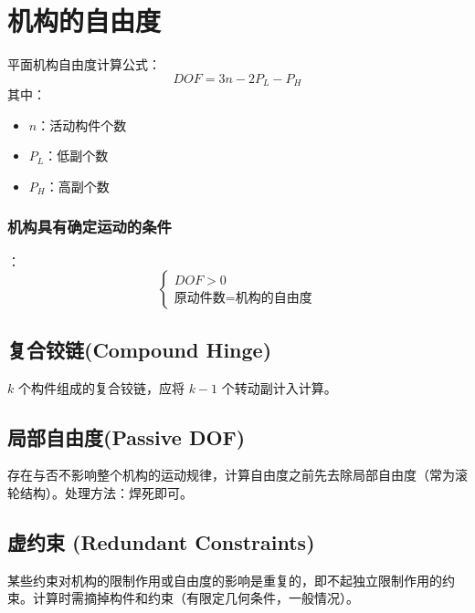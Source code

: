 \section{机构的自由度}
平面机构自由度计算公式：
\[
DOF = 3n - 2P_L - P_H
\]
其中：
\begin{itemize}
    \item \(n\)：活动构件个数
    \item \(P_L\)：低副个数
    \item \(P_H\)：高副个数
\end{itemize}

\subsubsection{机构具有确定运动的条件}：
\[
\begin{cases}
DOF > 0 \\
\text{原动件数} = \text{机构的自由度}
\end{cases}
\]

\subsection{复合铰链(Compound Hinge)}
\(k\) 个构件组成的复合铰链，应将 \(k-1\) 个转动副计入计算。

\subsection{局部自由度(Passive DOF)}
存在与否不影响整个机构的运动规律，计算自由度之前先去除局部自由度（常为滚轮结构）。处理方法：焊死即可。

\subsection{虚约束 (Redundant Constraints)}
某些约束对机构的限制作用或自由度的影响是重复的，即不起独立限制作用的约束。计算时需摘掉构件和约束（有限定几何条件，一般情况）。

